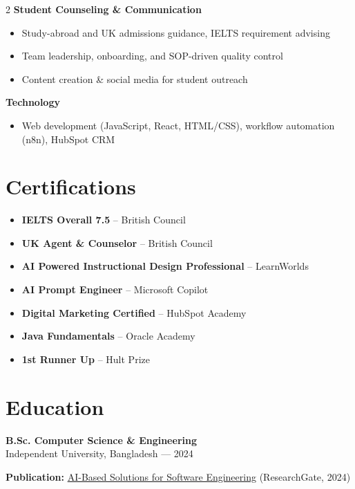 \documentclass[a4paper,10pt]{article}
\begin{document}
\begin{multicols}{2}
\textbf{Student Counseling \& Communication}
\begin{itemize}[leftmargin=1em]
  \item Study-abroad and UK admissions guidance, IELTS requirement advising
  \item Team leadership, onboarding, and SOP-driven quality control
  \item Content creation \& social media for student outreach
\end{itemize}

\textbf{Technology}
\begin{itemize}[leftmargin=1em]
  \item Web development (JavaScript, React, HTML/CSS), workflow automation (n8n), HubSpot CRM
\\
\end{itemize}

\section*{Certifications}
\begin{itemize}[leftmargin=1em]
  \item \textbf{IELTS Overall 7.5} -- British Council
  \item \textbf{UK Agent \& Counselor} -- British Council
  \item \textbf{AI Powered Instructional Design Professional} -- LearnWorlds
  \item \textbf{AI Prompt Engineer} -- Microsoft Copilot
  \item \textbf{Digital Marketing Certified} -- HubSpot Academy
  \item \textbf{Java Fundamentals} -- Oracle Academy
  \item \textbf{1st Runner Up} -- Hult Prize
  \\
\end{itemize}

\section*{Education}
\textbf{B.Sc. Computer Science \& Engineering} \\
Independent University, Bangladesh --- 2024

\vspace{2pt}
\textbf{Publication:} \href{https://www.researchgate.net/publication/387219249_AI_based_solutions_for_Software_Engineering}{AI-Based Solutions for Software Engineering} (ResearchGate, 2024)


\end{multicols}
\end{document}
